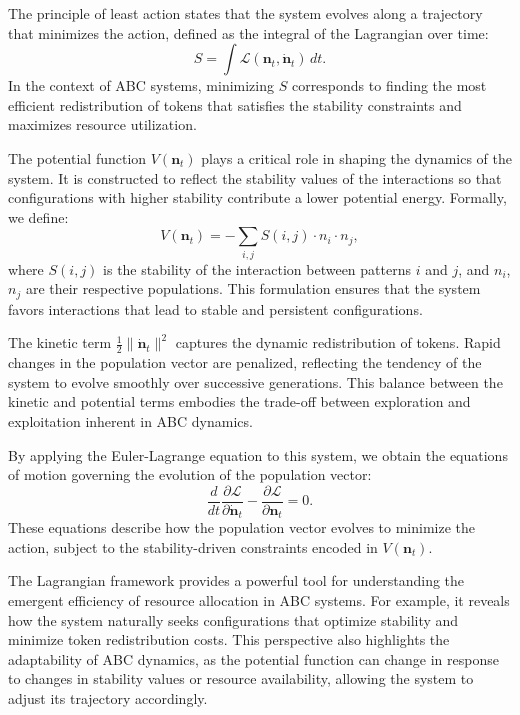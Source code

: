 \documentclass[%
 preprint, linenumbers,
 amsmath,amssymb,
 aps, physrev,
]{revtex4-2}
\begin{document}
The principle of least action states that the system evolves along a trajectory that minimizes the action, defined as the integral of the Lagrangian over time:
\begin{equation}
S = \int \mathcal{L}(\mathbf{n}_t, \dot{\mathbf{n}}_t) \, dt.
\end{equation}
In the context of ABC systems, minimizing $S$ corresponds to finding the most efficient redistribution of tokens that satisfies the stability constraints and maximizes resource utilization.

The potential function $V(\mathbf{n}_t)$ plays a critical role in shaping the dynamics of the system. It is constructed to reflect the stability values of the interactions so that configurations with higher stability contribute a lower potential energy. Formally, we define:
\begin{equation}
V(\mathbf{n}_t) = -\sum_{i,j} S(i, j) \cdot n_i \cdot n_j,
\end{equation}
where $S(i, j)$ is the stability of the interaction between patterns $i$ and $j$, and $n_i$, $n_j$ are their respective populations. This formulation ensures that the system favors interactions that lead to stable and persistent configurations.

The kinetic term $\frac{1}{2} \|\dot{\mathbf{n}}_t\|^2$ captures the dynamic redistribution of tokens. Rapid changes in the population vector are penalized, reflecting the tendency of the system to evolve smoothly over successive generations. This balance between the kinetic and potential terms embodies the trade-off between exploration and exploitation inherent in ABC dynamics.

By applying the Euler-Lagrange equation to this system, we obtain the equations of motion governing the evolution of the population vector:
\begin{equation}
\frac{d}{dt} \frac{\partial \mathcal{L}}{\partial \dot{\mathbf{n}}_t} - \frac{\partial \mathcal{L}}{\partial \mathbf{n}_t} = 0.
\end{equation}
These equations describe how the population vector evolves to minimize the action, subject to the stability-driven constraints encoded in $V(\mathbf{n}_t)$.

The Lagrangian framework provides a powerful tool for understanding the emergent efficiency of resource allocation in ABC systems. For example, it reveals how the system naturally seeks configurations that optimize stability and minimize token redistribution costs. This perspective also highlights the adaptability of ABC dynamics, as the potential function can change in response to changes in stability values or resource availability, allowing the system to adjust its trajectory accordingly.
\end{document}

